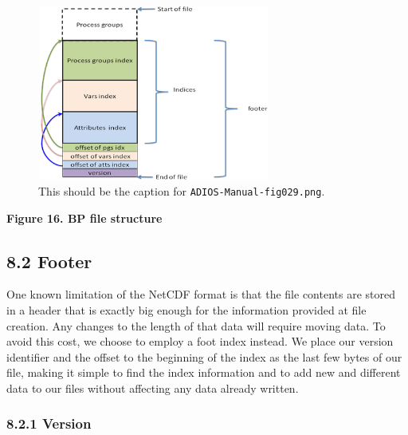 \begin{figure}[htbp]
\begin{center}
\includegraphics[width=217pt, height=163pt]{ADIOS-Manual-fig029.png}
\caption{This should be the caption for \texttt{ADIOS-Manual-fig029.png}.}
\end{center}
\end{figure}\label{HRef119578739}\label{HToc144350175}

\vspace{22pt}
\begin{center}
{\color{color20} \textbf{Figure 16. BP file structure\label{HToc84890270}\label{HToc212016646}\label{HToc212016888}\label{HToc182553417}}}
\end{center}

\vspace{10pt}
\subsection*{{\large 8.2 }{\large \textbf{Footer}}}

\vspace{10pt}
One known limitation of the NetCDF format is that the file contents are stored 
in a header that is exactly big enough for the information provided at file creation. 
Any changes to the length of that data will require moving data. To avoid this 
cost, we choose to employ a foot index instead. We place our version identifier 
and the offset to the beginning of the index as the last few bytes of our file, 
making it simple to find the index information and to add new and different data 
to our files without affecting any data already written. \label{HToc84890271}\label{HToc212016647}\label{HToc212016889}\label{HToc182553418}

\vspace{10pt}
\subsubsection*{{\large \textbf{8.2.1 Version}}}

